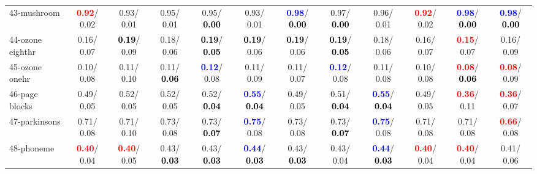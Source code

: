 \begin{table}[h]
\begin{center}
{\begin{tabular}{lc|c|c|c|c|c|c|c|c|c|c}
43-mushroom & \textcolor{red}{\textbf{  0.92}}/  0.02 &   0.93/  0.01 &   0.95/  0.01 &   0.95/\textcolor{black}{\textbf{  0.00}} &   0.93/  0.01 & \textcolor{blue}{\textbf{  0.98}}/\textcolor{black}{\textbf{  0.00}} &   0.97/\textcolor{black}{\textbf{  0.00}} &   0.96/  0.01 & \textcolor{red}{\textbf{  0.92}}/  0.02 & \textcolor{blue}{\textbf{  0.98}}/\textcolor{black}{\textbf{  0.00}} & \textcolor{blue}{\textbf{  0.98}}/\textcolor{black}{\textbf{  0.00}} \\
44-ozone eighthr &   0.16/  0.07 & \textcolor{black}{\textbf{  0.19}}/  0.09 &   0.18/  0.06 & \textcolor{black}{\textbf{  0.19}}/\textcolor{black}{\textbf{  0.05}} & \textcolor{black}{\textbf{  0.19}}/  0.06 & \textcolor{black}{\textbf{  0.19}}/  0.06 & \textcolor{black}{\textbf{  0.19}}/\textcolor{black}{\textbf{  0.05}} &   0.18/  0.06 &   0.16/  0.07 & \textcolor{red}{\textbf{  0.15}}/  0.07 &   0.16/  0.09 \\
45-ozone onehr &   0.10/  0.08 &   0.11/  0.10 &   0.11/\textcolor{black}{\textbf{  0.06}} & \textcolor{blue}{\textbf{  0.12}}/  0.08 &   0.11/  0.09 &   0.11/  0.07 & \textcolor{blue}{\textbf{  0.12}}/  0.08 &   0.11/  0.08 &   0.10/  0.08 & \textcolor{red}{\textbf{  0.08}}/\textcolor{black}{\textbf{  0.06}} & \textcolor{red}{\textbf{  0.08}}/  0.09 \\
46-page blocks &   0.49/  0.05 &   0.52/  0.05 &   0.52/  0.05 &   0.52/\textcolor{black}{\textbf{  0.04}} & \textcolor{blue}{\textbf{  0.55}}/\textcolor{black}{\textbf{  0.04}} &   0.49/  0.05 &   0.51/\textcolor{black}{\textbf{  0.04}} & \textcolor{blue}{\textbf{  0.55}}/\textcolor{black}{\textbf{  0.04}} &   0.49/  0.05 & \textcolor{red}{\textbf{  0.36}}/  0.11 & \textcolor{red}{\textbf{  0.36}}/  0.07 \\ \hline
47-parkinsons &   0.71/  0.08 &   0.71/  0.10 &   0.73/  0.08 &   0.73/\textcolor{black}{\textbf{  0.07}} & \textcolor{blue}{\textbf{  0.75}}/  0.08 &   0.73/  0.08 &   0.73/\textcolor{black}{\textbf{  0.07}} & \textcolor{blue}{\textbf{  0.75}}/  0.08 &   0.71/  0.08 &   0.71/  0.08 & \textcolor{red}{\textbf{  0.66}}/  0.08 \\
48-phoneme & \textcolor{red}{\textbf{  0.40}}/  0.04 & \textcolor{red}{\textbf{  0.40}}/  0.05 &   0.43/\textcolor{black}{\textbf{  0.03}} &   0.43/\textcolor{black}{\textbf{  0.03}} & \textcolor{blue}{\textbf{  0.44}}/\textcolor{black}{\textbf{  0.03}} &   0.43/\textcolor{black}{\textbf{  0.03}} &   0.43/  0.04 & \textcolor{blue}{\textbf{  0.44}}/\textcolor{black}{\textbf{  0.03}} & \textcolor{red}{\textbf{  0.40}}/  0.04 & \textcolor{red}{\textbf{  0.40}}/  0.04 &   0.41/  0.06 \\

\end{tabular}}
\end{center}
\end{table}
